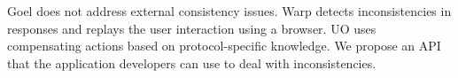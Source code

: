 Goel does not address external consistency issues. Warp \cite{warp} detects inconsistencies in responses and replays the user interaction using a browser. UO uses compensating actions based on protocol-specific knowledge. We propose an API that the application developers can use to deal with inconsistencies.



























